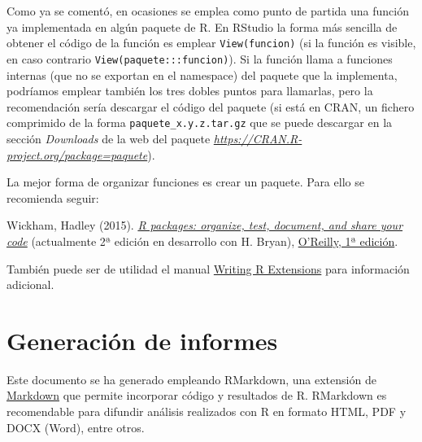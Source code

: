 \documentclass[
]{book}
\newenvironment{Shaded}{\begin{snugshade}}{\end{snugshade}}
\newcommand{\ControlFlowTok}[1]{\textcolor[rgb]{0.13,0.29,0.53}{\textbf{#1}}}
\newcommand{\FunctionTok}[1]{\textcolor[rgb]{0.13,0.29,0.53}{\textbf{#1}}}
\newcommand{\NormalTok}[1]{#1}
\newcommand{\OtherTok}[1]{\textcolor[rgb]{0.56,0.35,0.01}{#1}}
\newcommand{\SpecialCharTok}[1]{\textcolor[rgb]{0.81,0.36,0.00}{\textbf{#1}}}
\newcommand{\StringTok}[1]{\textcolor[rgb]{0.31,0.60,0.02}{#1}}
\theoremstyle{break}
\theoremstyle{nonumberplain}
\begin{document}
\begin{Shaded}
\end{Shaded}

Como ya se comentó, en ocasiones se emplea como punto de partida una función ya implementada en algún paquete de R.
En RStudio la forma más sencilla de obtener el código de la función es emplear \texttt{View(funcion)} (si la función es visible, en caso contrario \texttt{View(paquete:::funcion)}).
Si la función llama a funciones internas (que no se exportan en el namespace) del paquete que la implementa, podríamos emplear también los tres dobles puntos para llamarlas, pero la recomendación sería descargar el código del paquete (si está en CRAN, un fichero comprimido de la forma \texttt{paquete\_x.y.z.tar.gz} que se puede descargar en la sección \emph{Downloads} de la web del paquete \emph{\url{https://CRAN.R-project.org/package=paquete}}).

La mejor forma de organizar funciones es crear un paquete.
Para ello se recomienda seguir:

Wickham, Hadley (2015). \emph{\href{http://r-pkgs.had.co.nz/}{R packages: organize, test, document, and share your code}} (actualmente 2ª edición en desarrollo con H. Bryan), \href{http://shop.oreilly.com/product/0636920034421.do}{O'Reilly, 1ª edición}.

También puede ser de utilidad el manual \href{http://colinfay.me/writing-r-extensions}{Writing R Extensions} para información adicional.

\chapter{Generación de informes}\label{informes}

Este documento se ha generado empleando RMarkdown, una extensión de \href{https://es.wikipedia.org/wiki/Markdown}{Markdown} que permite incorporar código y resultados de R.
RMarkdown es recomendable para difundir análisis realizados con R en formato HTML, PDF y DOCX (Word), entre otros.
\end{document}
